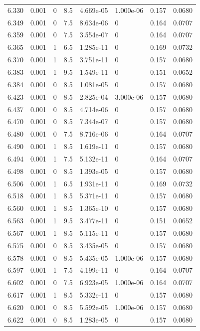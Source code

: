 \documentclass[preview]{standalone}
\begin{document}
{{{{{{{\begin{tabular}{L{1.2cm}C{1.2cm} C{0.3cm}C{0.5cm} C{1.4cm}C{1.4cm} C{1.4cm}C{1.4cm}}
  6.330  &  0.001  & 0     & 8.5 &  4.669e-05  & 1.000e-06  & 0.157 &  0.0680   \\ 
  6.349  &  0.001  & 0     & 7.5 &  8.634e-06  & 0  & 0.164 &  0.0707   \\ 
  6.359  &  0.001  & 0     & 7.5 &  3.554e-07  & 0  & 0.164 &  0.0707   \\ 
  6.365  &  0.001  & 1     & 6.5 &  1.285e-11  & 0  & 0.169 &  0.0732   \\ 
  6.370  &  0.001  & 1     & 8.5 &  3.751e-11  & 0  & 0.157 &  0.0680   \\ 
  6.383  &  0.001  & 1     & 9.5 &  1.549e-11  & 0  & 0.151 &  0.0652   \\ 
  6.384  &  0.001  & 0     & 8.5 &  1.081e-05  & 0  & 0.157 &  0.0680   \\ 
  6.423  &  0.001  & 0     & 8.5 &  2.825e-04  & 3.000e-06  & 0.157 &  0.0680   \\ 
  6.437  &  0.001  & 0     & 8.5 &  4.714e-06  & 0  & 0.157 &  0.0680   \\ 
  6.470  &  0.001  & 0     & 8.5 &  7.344e-07  & 0  & 0.157 &  0.0680   \\ 
  6.480  &  0.001  & 0     & 7.5 &  8.716e-06  & 0  & 0.164 &  0.0707   \\ 
  6.490  &  0.001  & 1     & 8.5 &  1.619e-11  & 0  & 0.157 &  0.0680   \\ 
  6.494  &  0.001  & 1     & 7.5 &  5.132e-11  & 0  & 0.164 &  0.0707   \\ 
  6.498  &  0.001  & 0     & 8.5 &  1.393e-05  & 0  & 0.157 &  0.0680   \\ 
  6.506  &  0.001  & 1     & 6.5 &  1.931e-11  & 0  & 0.169 &  0.0732   \\ 
  6.518  &  0.001  & 1     & 8.5 &  5.371e-11  & 0  & 0.157 &  0.0680   \\ 
  6.560  &  0.001  & 1     & 8.5 &  1.365e-10  & 0  & 0.157 &  0.0680   \\ 
  6.563  &  0.001  & 1     & 9.5 &  3.477e-11  & 0  & 0.151 &  0.0652   \\ 
  6.567  &  0.001  & 1     & 8.5 &  5.115e-11  & 0  & 0.157 &  0.0680   \\ 
  6.575  &  0.001  & 0     & 8.5 &  3.435e-05  & 0  & 0.157 &  0.0680   \\ 
  6.578  &  0.001  & 0     & 8.5 &  5.435e-05  & 1.000e-06  & 0.157 &  0.0680   \\ 
  6.597  &  0.001  & 1     & 7.5 &  4.199e-11  & 0  & 0.164 &  0.0707   \\ 
  6.602  &  0.001  & 0     & 7.5 &  6.923e-05  & 1.000e-06  & 0.164 &  0.0707   \\ 
  6.617  &  0.001  & 1     & 8.5 &  5.332e-11  & 0  & 0.157 &  0.0680   \\ 
  6.620  &  0.001  & 0     & 8.5 &  5.592e-05  & 1.000e-06  & 0.157 &  0.0680   \\ 
  6.622  &  0.001  & 0     & 8.5 &  1.283e-05  & 0  & 0.157 &  0.0680   \\ 
\hline 
\end{tabular} 

}}}}}}}
\end{document}
